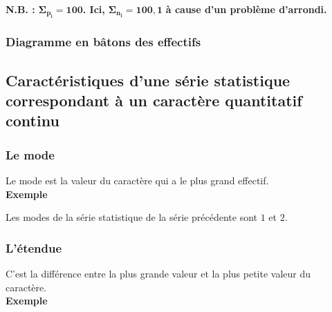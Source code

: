\medskip 

\textbf{N.B. : } $\mathbf{\Sigma_{p_i} = 100}$\textbf{. Ici, }$\mathbf{\Sigma_{n_i} = 100,1}$\textbf{ à cause d'un problème d'arrondi. } 

\newpage 

\subsubsection{Diagramme en bâtons des effectifs}

\smallskip 

\begin{center}
\end{center}

\subsection{Caractéristiques d'une série statistique correspondant à un caractère quantitatif continu}

\subsubsection{Le mode}

Le mode est la  valeur du caractère qui a le plus grand effectif. \\

\textbf{Exemple}

Les modes de la série statistique de la série précédente sont $1$ et $2$.

\subsubsection{L'étendue}

C'est la différence entre la plus grande valeur et la plus petite valeur du caractère. \\

\textbf{Exemple}

